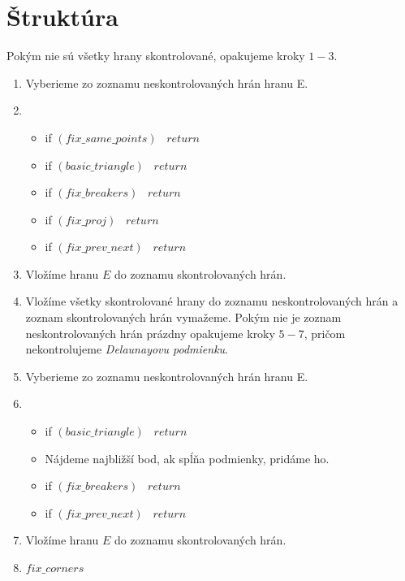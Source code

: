 \section{Štruktúra}

Pokým nie sú všetky hrany skontrolované, opakujeme kroky $1-3$.
\begin{enumerate}
    \item{
        Vyberieme zo zoznamu neskontrolovaných hrán hranu E.
    }
    \item{
        \begin{itemize}
            \item{
                if $(fix\_same\_points)$ \, $return$
            }
            \item{
                if $(basic\_triangle)$ \, $return$
            }
            \item{
                if $(fix\_breakers)$ \, $return$
            }
            \item{
                if $(fix\_proj)$ \, $return$
            }
            \item{
                if $(fix\_prev\_next)$ \, $return$
            }
        \end{itemize}
    }
    \item{
        Vložíme hranu $E$ do zoznamu skontrolovaných hrán.
    }
    \item{
        Vložíme všetky skontrolované hrany do zoznamu neskontrolovaných hrán a 
        zoznam skontrolovaných hrán vymažeme. Pokým nie je zoznam neskontrolovaných hrán prázdny
        opakujeme kroky $5-7$, pričom nekontrolujeme \textit{Delaunayovu podmienku}.
    }
    \item{
        Vyberieme zo zoznamu neskontrolovaných hrán hranu E.
    }
    \item{
        \begin{itemize}
            \item{
                if $(basic\_triangle)$ \, $return$
            }
            \item{
                Nájdeme najbližší bod, ak spĺňa podmienky, pridáme ho.
            }
            \item{
                if $(fix\_breakers)$ \, $return$
            }
            \item{
                if $(fix\_prev\_next)$ \, $return$
            }
        \end{itemize}
    }
    \item{
        Vložíme hranu $E$ do zoznamu skontrolovaných hrán.
    }
    \item{
        $fix\_corners$
    }
\end{enumerate}

